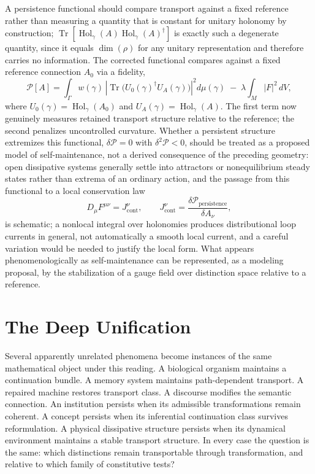 \documentclass[11pt]{article}
\newcommand{\Hol}{\operatorname{Hol}}
\newcommand{\Tr}{\operatorname{Tr}}
\begin{document}
A persistence functional should compare transport against a fixed reference rather than measuring a quantity that is constant for unitary holonomy by construction; $\Tr[\Hol_\gamma(A) \Hol_\gamma(A)^\dagger]$ is exactly such a degenerate quantity, since it equals $\dim(\rho)$ for any unitary representation and therefore carries no information. The corrected functional compares against a fixed reference connection $A_0$ via a fidelity,
\[
\mathcal{P}[A] = \int_\Gamma w(\gamma)\, \left| \Tr\bigl( U_0(\gamma)^\dagger U_A(\gamma) \bigr) \right|^2 d\mu(\gamma) \;-\; \lambda \int_M |F|^2\, dV,
\]
where $U_0(\gamma) = \Hol_\gamma(A_0)$ and $U_A(\gamma) = \Hol_\gamma(A)$. The first term now genuinely measures retained transport structure relative to the reference; the second penalizes uncontrolled curvature. Whether a persistent structure extremizes this functional, $\delta \mathcal{P} = 0$ with $\delta^2\mathcal{P} < 0$, should be treated as a proposed model of self-maintenance, not a derived consequence of the preceding geometry: open dissipative systems generally settle into attractors or nonequilibrium steady states rather than extrema of an ordinary action, and the passage from this functional to a local conservation law
\[
D_\mu F^{\mu\nu} = J^\nu_{\text{cont}}, \qquad J^\nu_{\text{cont}} = \frac{\delta \mathcal{P}_{\text{persistence}}}{\delta A_\nu},
\]
is schematic; a nonlocal integral over holonomies produces distributional loop currents in general, not automatically a smooth local current, and a careful variation would be needed to justify the local form. What appears phenomenologically as self-maintenance can be represented, as a modeling proposal, by the stabilization of a gauge field over distinction space relative to a reference.

\section{The Deep Unification}

Several apparently unrelated phenomena become instances of the same mathematical object under this reading. A biological organism maintains a continuation bundle. A memory system maintains path-dependent transport. A repaired machine restores transport class. A discourse modifies the semantic connection. An institution persists when its admissible transformations remain coherent. A concept persists when its inferential continuation class survives reformulation. A physical dissipative structure persists when its dynamical environment maintains a stable transport structure. In every case the question is the same: which distinctions remain transportable through transformation, and relative to which family of constitutive tests?
\end{document}
